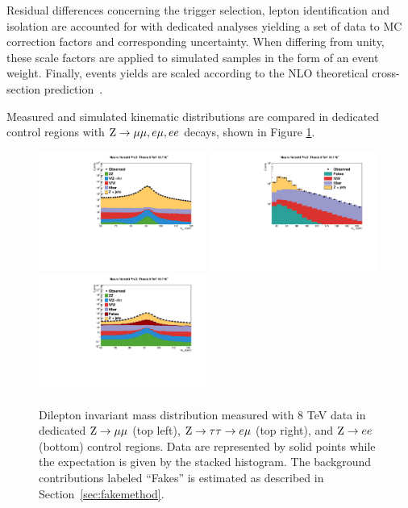 Residual differences concerning the trigger selection, lepton identification and isolation are accounted for with dedicated analyses yielding a set of data to MC correction factors and corresponding uncertainty. When differing from unity, these scale factors are applied to simulated samples in the form of an event weight.
Finally, events yields are scaled according to the NLO theoretical cross-section prediction~\cite{MCFM}. 

Measured and simulated kinematic distributions are compared in dedicated control regions with $\mathrm{Z}\rightarrow\mu\mu,e\mu,ee$ decays, shown in Figure \ref{fig:(dis)agreement}. %

\begin{figure}
\centering
\includegraphics[width=0.49\textwidth]{4_Analisys/pics/8TeV/plots/zmm/mass_rebin_log.pdf}
\includegraphics[width=0.49\textwidth]{4_Analisys/pics/8TeV/plots/em/mass_rebin_log-fakes.pdf}\\
\includegraphics[width=0.49\textwidth]{4_Analisys/pics/8TeV/plots/zee/mass_wfakes_log.pdf}
\caption{Dilepton invariant mass distribution measured with 8 TeV data in dedicated $\mathrm{Z}\rightarrow\mu\mu$ (top left), $\mathrm{Z}\rightarrow \tau\tau \rightarrow e\mu$ (top right), and $\mathrm{Z}\rightarrow ee$ (bottom) control regions. Data are represented by solid points while the expectation is given by the stacked histogram. The background contributions labeled ``Fakes'' is estimated as described in Section~\ref{sec:fakemethod}. %
}
\label{fig:(dis)agreement}
\end{figure}

